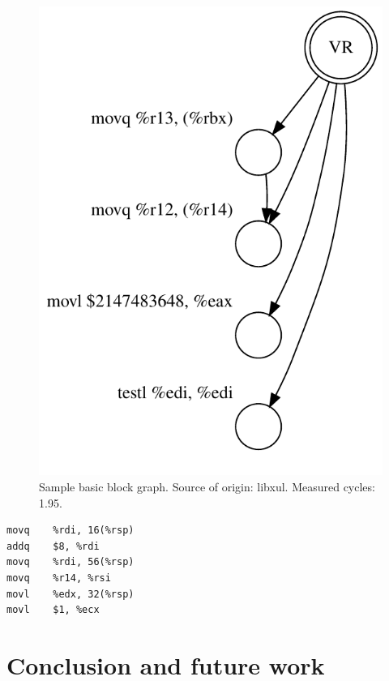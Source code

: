 \begin{figure}[h]
  \caption{Sample basic block graph. Source of origin: libxul. Measured cycles: 1.95.}
  \centering
  \includegraphics[width=0.4\columnwidth]{sample_graph}
\end{figure}

\begin{lstlisting}[title={Source of the sample basic block}]
movq	%rdi, 16(%rsp)
addq	$8, %rdi
movq	%rdi, 56(%rsp)
movq	%r14, %rsi
movl	%edx, 32(%rsp)
movl	$1, %ecx
\end{lstlisting}

\section{Conclusion and future work}

